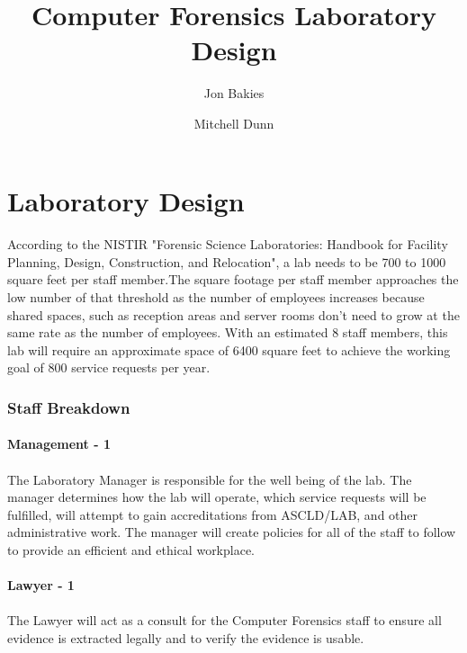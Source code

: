 \documentclass{article}
\begin{document}
\title{Computer Forensics Laboratory Design}
\author{Jon Bakies \and Mitchell Dunn} 

\maketitle
\newpage

\tableofcontents
\newpage


\section{Laboratory Design}

\paragraph{} According to the NISTIR "Forensic Science Laboratories: Handbook for Facility Planning, Design, Construction, and Relocation", a lab needs to be 700 to 1000 square feet per staff member.The square footage per staff member approaches the low number of that threshold as the number of employees increases because shared spaces, such as reception areas and server rooms don't need to grow at the same rate as the number of employees.  With an estimated 8 staff members, this lab will require an approximate space of 6400 square feet to achieve the working goal of 800 service requests per year.

\subsubsection{Staff Breakdown}
\paragraph {Management - 1} 
\paragraph{} The Laboratory Manager is responsible for the well being of the lab.  The manager determines how the lab will operate, which service requests will be fulfilled, will attempt to gain accreditations from ASCLD/LAB, and other administrative work.  The manager will create policies for all of the staff to follow to provide an efficient and ethical workplace.
 
\paragraph{Lawyer - 1} 
\paragraph{} The Lawyer will act as a consult for the Computer Forensics staff to ensure all evidence is extracted legally and to verify the evidence is usable.
\end{document}
